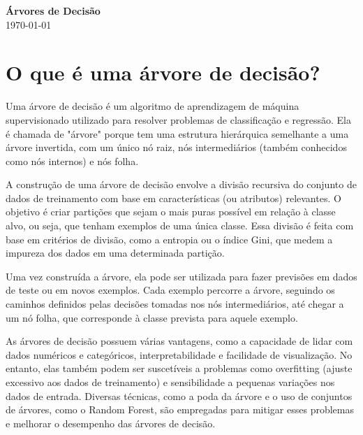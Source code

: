 \documentclass[12pt,a4paper, brazil]{article}
\begin{document}
\begin{center}
{\textbf {\huge Árvores de Decisão}}\\[5mm]
\today\\[5mm] %
\end{center}



\section{O que é uma árvore de decisão?}

Uma árvore de decisão é um algoritmo de aprendizagem de máquina supervisionado utilizado para resolver problemas de classificação e regressão. Ela é chamada de "árvore" porque tem uma estrutura hierárquica semelhante a uma árvore invertida, com um único nó raiz, nós intermediários (também conhecidos como nós internos) e nós folha.

A construção de uma árvore de decisão envolve a divisão recursiva do conjunto de dados de treinamento com base em características (ou atributos) relevantes. O objetivo é criar partições que sejam o mais puras possível em relação à classe alvo, ou seja, que tenham exemplos de uma única classe. Essa divisão é feita com base em critérios de divisão, como a entropia ou o índice Gini, que medem a impureza dos dados em uma determinada partição.

Uma vez construída a árvore, ela pode ser utilizada para fazer previsões em dados de teste ou em novos exemplos. Cada exemplo percorre a árvore, seguindo os caminhos definidos pelas decisões tomadas nos nós intermediários, até chegar a um nó folha, que corresponde à classe prevista para aquele exemplo.

As árvores de decisão possuem várias vantagens, como a capacidade de lidar com dados numéricos e categóricos, interpretabilidade e facilidade de visualização. No entanto, elas também podem ser suscetíveis a problemas como overfitting (ajuste excessivo aos dados de treinamento) e sensibilidade a pequenas variações nos dados de entrada. Diversas técnicas, como a poda da árvore e o uso de conjuntos de árvores, como o Random Forest, são empregadas para mitigar esses problemas e melhorar o desempenho das árvores de decisão.
\end{document}
